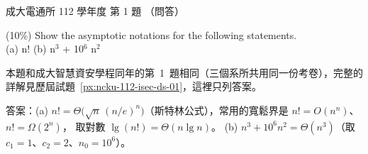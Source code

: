 \begin{pastexam}[label={px:ncku-112-cce-ds-01}]{成大電通所 112 學年度 第 1 題}
（問答）

(10\%) Show the asymptotic notations for the following statements.\\
(a) n! \qquad (b) n$^3$ + 10$^6$ n$^2$
\end{pastexam}

\begin{pastsoln}
本題和成大智慧資安學程同年的第~1~題相同（三個系所共用同一份考卷），完整的詳解見歷屆試題~\ref{px:ncku-112-isec-ds-01}，這裡只列答案。

答案：(a) $n! = \Theta\bigl(\sqrt{n}\,(n/e)^n\bigr)$（斯特林公式），常用的寬鬆界是 $n! = O(n^n)$、$n! = \Omega(2^n)$，
取對數 $\lg(n!) = \Theta(n \lg n)$。 (b) $n^3 + 10^6 n^2 = \Theta(n^3)$（取 $c_1 = 1$、$c_2 = 2$、$n_0 = 10^6$）。
\end{pastsoln}
